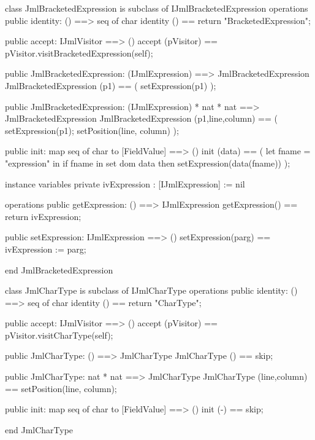 \begin{vdm_al}
class JmlBracketedExpression is subclass of IJmlBracketedExpression
operations
  public identity: () ==> seq of char
  identity () == return "BracketedExpression";

  public accept: IJmlVisitor ==> ()
  accept (pVisitor) == pVisitor.visitBracketedExpression(self);

  public JmlBracketedExpression:
    (IJmlExpression) ==> JmlBracketedExpression
  JmlBracketedExpression (p1) == 
    ( setExpression(p1) );

  public JmlBracketedExpression:
    (IJmlExpression) *
    nat *
    nat ==> JmlBracketedExpression
  JmlBracketedExpression (p1,line,column) == 
    ( setExpression(p1);
      setPosition(line, column) );

  public init: map seq of char to [FieldValue] ==> ()
  init (data) ==
    ( let fname = "expression" in
        if fname in set dom data
        then setExpression(data(fname)) );

instance variables
  private ivExpression : [IJmlExpression] := nil

operations
  public getExpression: () ==> IJmlExpression
  getExpression() == return ivExpression;

  public setExpression: IJmlExpression ==> ()
  setExpression(parg) == ivExpression := parg;

end JmlBracketedExpression
\end{vdm_al}

\begin{vdm_al}
class JmlCharType is subclass of IJmlCharType
operations
  public identity: () ==> seq of char
  identity () == return "CharType";

  public accept: IJmlVisitor ==> ()
  accept (pVisitor) == pVisitor.visitCharType(self);

  public JmlCharType:
    () ==> JmlCharType
  JmlCharType () == 
    skip;

  public JmlCharType:
    nat *
    nat ==> JmlCharType
  JmlCharType (line,column) == 
    setPosition(line, column);

  public init: map seq of char to [FieldValue] ==> ()
  init (-) == skip;

end JmlCharType
\end{vdm_al}

